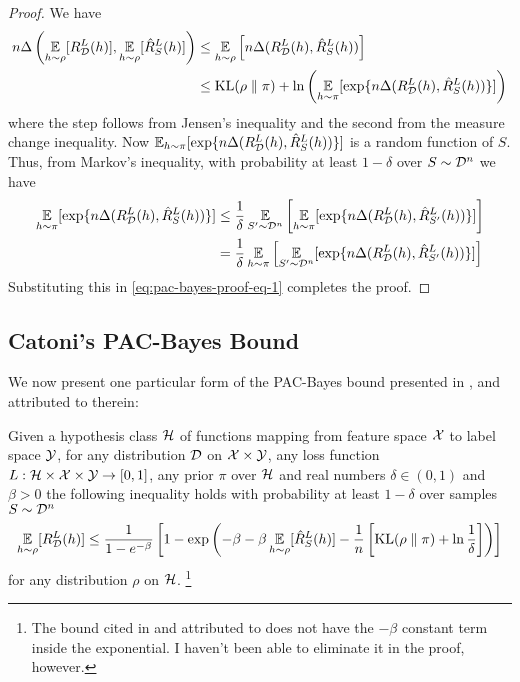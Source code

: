 \begin{proof}
  We have
  \begin{equation}
    \label{eq:pac-bayes-proof-eq-1}
    \begin{split}
      n \Delta\left(\operatorname*{\mathbb{E}}_{h \sim \rho}[R_{\mathcal{D}}^L(h)], \operatorname*{\mathbb{E}}_{h \sim
      \rho}[\hat{R}_S^L(h)]\right)
      &\leq \operatorname*{\mathbb{E}}_{h \sim \rho}\left[n \Delta(R_{\mathcal{D}}^L(h), \hat{R}_S^L(h))\right]
      \\
      &\leq \text{KL}(\rho \parallel \pi) + \ln\left(\operatorname*{\mathbb{E}}_{h \sim \pi}[\exp\{n
      \Delta(R_{\mathcal{D}}^L(h), \hat{R}_S^L(h))\}]\right)
    \end{split}
  \end{equation}
  where the step follows from Jensen's inequality and the second from the
  measure change inequality. Now $\operatorname*{\mathbb{E}}_{h \sim \pi}[\exp\{n \Delta(R_{\mathcal{D}}^L(h),
  \hat{R}_S^L(h))\}]$ is a random function of $S$. Thus, from Markov's
  inequality, with probability at least $1 - \delta$ over $S \sim \mathcal{D}^n$ we have
  \begin{equation}
    \begin{split}
      \operatorname*{\mathbb{E}}_{h \sim \pi}[\exp\{n \Delta(R_{\mathcal{D}}^L(h), \hat{R}_S^L(h))\}]
      &\leq \frac{1}{\delta} \operatorname*{\mathbb{E}}_{S' \sim \mathcal{D}^n}\left[\operatorname*{\mathbb{E}}_{h \sim \pi}[\exp\{n
      \Delta(R_{\mathcal{D}}^L(h), \hat{R}_{S'}^L(h))\}]\right] \\
      &= \frac{1}{\delta} \operatorname*{\mathbb{E}}_{h \sim \pi}\left[\operatorname*{\mathbb{E}}_{S' \sim \mathcal{D}^n}[\exp\{n
      \Delta(R_{\mathcal{D}}^L(h), \hat{R}_{S'}^L(h))\}]\right]
    \end{split}
  \end{equation}
  Substituting this in \eqref{eq:pac-bayes-proof-eq-1} completes the proof.
\end{proof}

\subsection{Catoni's PAC-Bayes Bound}

We now present one particular form of the PAC-Bayes bound presented in
\cite{germain2016pac}, and attributed to \cite{catoni2007pac} therein:

\begin{theorem}
  \label{thm:catoni}
  Given a hypothesis class $\mathcal{H}$ of functions mapping from feature space $\mathcal{X}$
  to label space $\mathcal{Y}$, for any distribution $\mathcal{D}$ on $\mathcal{X} \times \mathcal{Y}$, any loss
  function $L : \mathcal{H} \times \mathcal{X} \times \mathcal{Y} \to [0, 1]$, any prior $\pi$ over
  $\mathcal{H}$ and real numbers $\delta \in (0, 1)$ and $\beta > 0$ the following
  inequality holds with probability at least $1 - \delta$ over samples $S \sim
  \mathcal{D}^n$
  \begin{equation}
    \label{eq:catoni-bound-unit}
    \operatorname*{\mathbb{E}}_{h \sim \rho}[R_{\mathcal{D}}^L(h)] \leq \frac{1}{1 - e^{-\beta}} \left[1 -
    \exp\left( - \beta - \beta \operatorname*{\mathbb{E}}_{h \sim \rho}[\hat{R}_S^L(h)] - \frac{1}{n}
    \left[\text{KL}(\rho \parallel \pi) + \ln \frac{1}{\delta}\right]\right)\right]
  \end{equation}
  for any distribution $\rho$ on $\mathcal{H}$. \footnote{The bound cited in
  \cite{germain2016pac} and attributed to \cite{catoni2007pac} does not have the
  $-\beta$ constant term inside the exponential. I haven't been able to
  eliminate it in the proof, however.}
\end{theorem}

